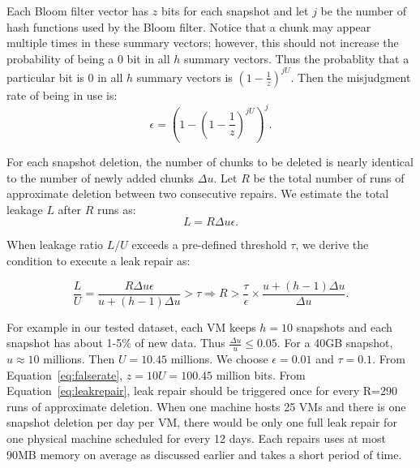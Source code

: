 Each Bloom filter vector has  $z$ bits for each snapshot and let $j$ be the number of hash functions used by the
Bloom filter.  Notice that a chunk may appear multiple times in these summary vectors; however, this should not 
increase the probability of being a 0 bit in all $h$ summary vectors.
Thus the probablity that a particular bit is 0  in all $h$ summary vectors is  
$(1- \frac{1}{z}) ^{j U}$. 
Then the misjudgment rate of being in use  is: 
\begin{equation}
\label{eq:falserate}
\epsilon = (1-(1-\frac{1}{z})^{jU})^j.
\end{equation}


For each snapshot deletion, the number of chunks to be deleted is nearly identical to the number of
newly added chunks $\Delta u$. 
Let $R$ be the total number of runs of approximate deletion between two consecutive 
repairs. We estimate  the total leakage $L$ after $R$ runs as:
\[
L = R \Delta u \epsilon.
\]

When leakage ratio $L/U$ exceeds a pre-defined threshold $\tau$, we derive the condition to execute a leak repair as:

\begin{equation}
\label{eq:leakrepair}
\frac{L}{U} = \frac{R \Delta u \epsilon}{u+(h-1)\Delta u } > \tau 
\Longrightarrow R > \frac{\tau}{\epsilon}\times\frac{u + (h-1)\Delta u}{\Delta u}.
\end{equation}

For example in our tested dataset,  
each VM keeps $h=10$ snapshots and each snapshot has
about 1-5\% of new data. Thus $\frac{\Delta u}{u} \leq 0.05$. For a 40GB snapshot, $u\approx  10$ millions.
Then $U=10.45$ millions.
We choose  $\epsilon = 0.01$ and $\tau=0.1$.  From Equation~\ref{eq:falserate}, 
$z=10U=100.45$ million bits. From Equation~\ref{eq:leakrepair}, 
leak repair should be triggered once for every R=290 runs of approximate deletion. 
When one machine hosts 25 VMs and there is one snapshot deletion per day per VM, there would be 
only one full leak repair for one physical machine scheduled for every 12 days. 
Each repairs uses at most  90MB memory on average
as discussed earlier and takes a short period of time.

